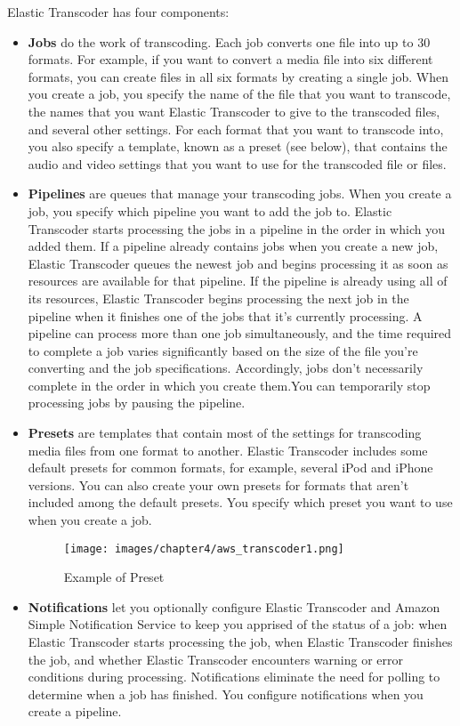 Elastic Transcoder has four components:
\begin{itemize}

\item \textbf{Jobs} do the work of transcoding. Each job converts one file into up to 30 formats. For example, if you want to convert a media file into six different formats, you can create files in all six formats by creating a single job. When you create a job, you specify the name of the file that you want to transcode, the names that you want Elastic Transcoder to give to the transcoded files, and several other settings. For each format that you want to transcode into, you also specify a template, known as a preset (see below), that contains the audio and video settings that you want to use for the transcoded file or files.

\item \textbf{Pipelines} are queues that manage your transcoding jobs. When you create a job, you specify which pipeline you want to add the job to. Elastic Transcoder starts processing the jobs in a pipeline in the order in which you added them. If a pipeline already contains jobs when you create a new job, Elastic Transcoder queues the newest job and begins processing it as soon as resources are available for that pipeline. If the pipeline is already using all of its resources, Elastic Transcoder begins processing the next job in the pipeline when it finishes one of the jobs that it's currently processing. A pipeline can process more than one job simultaneously, and the time required to complete a job varies significantly based on the size of the file you're converting and the job specifications. Accordingly, jobs don't necessarily complete in the order in which you create them.You can temporarily stop processing jobs by pausing the pipeline.

\item \textbf{Presets} are templates that contain most of the settings for transcoding media files from one format to another. Elastic Transcoder includes some default presets for common formats, for example, several iPod and iPhone versions. You can also create your own presets for formats that aren't included among the default presets. You specify which preset you want to use when you create a job.


\begin{figure}[htbp] %
 \centering
 \texttt{[image: images/chapter4/aws\_transcoder1.png]}\hfill
 \caption[Example of Preset]{Example of Preset}
 \label{fig:fourV}
\end{figure}


\item \textbf{Notifications} let you optionally configure Elastic Transcoder and Amazon Simple Notification Service to keep you apprised of the status of a job: when Elastic Transcoder starts processing the job, when Elastic Transcoder finishes the job, and whether Elastic Transcoder encounters warning or error conditions during processing. Notifications eliminate the need for polling to determine when a job has finished. You configure notifications when you create a pipeline.
\end{itemize}

